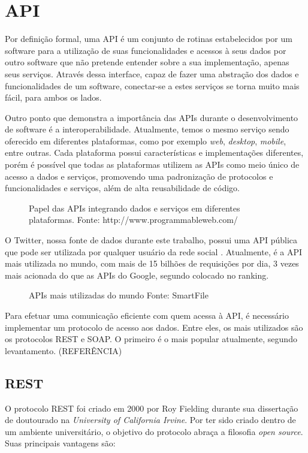 \section{API}\label{sec:api}

Por definição formal, uma API é um conjunto de rotinas estabelecidos por um software para a utilização de suas funcionalidades e acessos à seus dados por outro software que não pretende entender sobre a sua implementação, apenas seus serviços. Através dessa interface, capaz de fazer uma abstração dos dados e funcionalidades de um software, conectar-se a estes serviços se torna muito mais fácil, para ambos os lados.

Outro ponto que demonstra a importância das APIs durante o desenvolvimento de software é a interoperabilidade. Atualmente, temos o mesmo serviço sendo oferecido em diferentes plataformas, como por exemplo \textit{web}, \textit{desktop}, \textit{mobile}, entre outras. Cada plataforma possui características e implementações diferentes, porém é possível que todas as plataformas utilizem as APIs como meio único de acesso a dados e serviços, promovendo uma padronização de protocolos e funcionalidades e serviços, além de alta reusabilidade de código.

\begin{figure}[!h]
	\centering{}
	\caption{Papel das APIs integrando dados e serviços em diferentes plataformas. Fonte: http://www.programmableweb.com/}
	\label{uni}
\end{figure}

O Twitter, nossa fonte de dados durante este trabalho, possui uma API pública que pode ser utilizada por qualquer usuário da rede social \cite{twitterapidocs}. Atualmente, é a API mais utilizada no mundo, com mais de 15 bilhões de requisições por dia, 3 vezes mais acionada do que as APIs do Google, segundo colocado no ranking.

\begin{figure}[!h]
	\centering{}
	\caption{APIs mais utilizadas do mundo Fonte: SmartFile}
	\label{uni}
\end{figure}

Para efetuar uma comunicação eficiente com quem acessa à API, é necessário implementar um protocolo de acesso aos dados. Entre eles, os mais utilizados são os protocolos REST e SOAP. O primeiro é o mais popular atualmente, segundo levantamento. (REFERÊNCIA)

\subsection{REST}
O protocolo REST foi criado em 2000 por Roy Fielding \cite{fieldingrest} durante sua dissertação de doutourado na \textit{University of California Irvine}. Por ter sido criado dentro de um ambiente universitário, o objetivo do protocolo abraça a filosofia \textit{open source}. Suas principais vantagens são:


